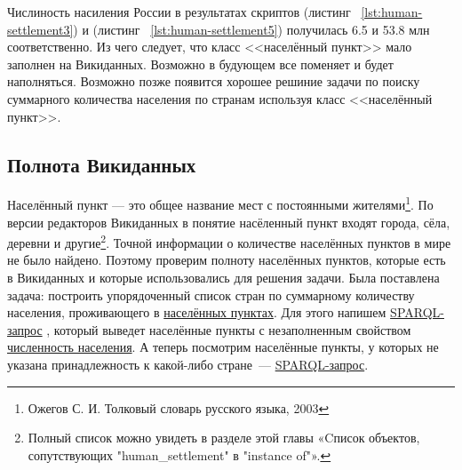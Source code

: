 Числиность насиления России в результатах скриптов (листинг ~\protect\ref{lst:human-settlement3}) и (листинг ~\protect\ref{lst:human-settlement5}) получилась \num{6,5} и \num{53,8} млн соответственно. Из чего следует, что класс <<населённый пункт>> мало заполнен на Викиданных. Возможно в будующем все поменяет и будет наполняться. Возможно позже появится хорошее решиние задачи по поиску суммарного количества населения по странам используя класс <<населённый пункт>>.

\subsection{Полнота Викиданных}

Населённый пункт — это общее название мест с постоянными жителями\footnote {Ожегов С. И. Толковый словарь русского языка, 2003}. По версии редакторов Викиданных в понятие насёленный пункт входят города, сёла, деревни и другие\footnote{Полный список можно увидеть в разделе этой главы «Cписок объектов, сопутствующих "human\_settlement" в "instance of"».}.
Точной информации о количестве населённых пунктов в мире не было найдено. Поэтому проверим полноту населённых пунктов, которые есть в Викиданных и которые использовались для решения задачи. Была поставлена задача: построить упорядоченный список стран по суммарному количеству населения, проживающего в \href{http://www.wikidata.org/entity/Q486972}{населённых пунктах}. Для этого напишем \href{https://w.wiki/4FUz}{SPARQL-запрос} \footnotemark, который выведет населённые пункты с незаполненным свойством \href{http://www.wikidata.org/entity/P1082}{численность населения}. 
А теперь посмотрим населённые пункты, у которых не указана принадлежность к какой-либо стране~--- \href{https://w.wiki/4FV8}{SPARQL-запрос}\footnotemark.


